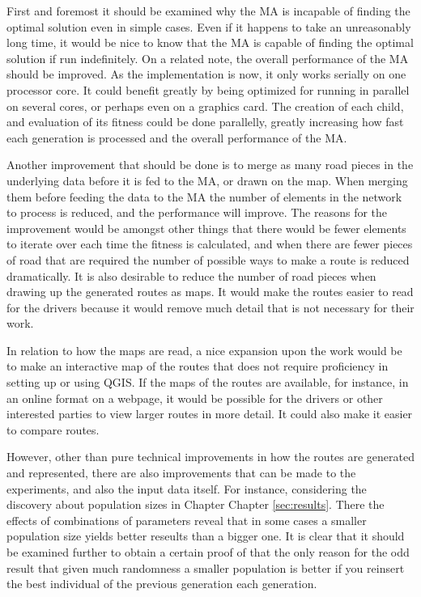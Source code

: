 First and foremost it should be examined why the MA is incapable of finding the optimal solution even in simple cases. Even if it happens to take an unreasonably long time, it would be nice to know that the MA is capable of finding the optimal solution if run indefinitely. On a related note, the overall performance of the MA should be improved. As the implementation is now, it only works serially on one processor core. It could benefit greatly by being optimized for running in parallel on several cores, or perhaps even on a graphics card. The creation of each child, and evaluation of its fitness could be done parallelly, greatly increasing how fast each generation is processed and the overall performance of the MA.

Another improvement that should be done is to merge as many road pieces in the underlying data before it is fed to the MA, or drawn on the map. When merging them before feeding the data to the MA the number of elements in the network to process is reduced, and the performance will improve. The reasons for the improvement would be amongst other things that there would be fewer elements to iterate over each time the fitness is calculated, and when there are fewer pieces of road that are required the number of possible ways to make a route is reduced dramatically. It is also desirable to reduce the number of road pieces when drawing up the generated routes as maps. It would make the routes easier to read for the drivers because it would remove much detail that is not necessary for their work.

In relation to how the maps are read, a nice expansion upon the work would be to make an interactive map of the routes that does not require proficiency in setting up or using QGIS. If the maps of the routes are available, for instance, in an online format on a webpage, it would be possible for the drivers or other interested parties to view larger routes in more detail. It could also make it easier to compare routes.

However, other than pure technical improvements in how the routes are generated and represented, there are also improvements that can be made to the experiments, and also the input data itself. 
For instance, considering the discovery about population sizes in Chapter Chapter \ref{sec:results}. There the effects of combinations of parameters reveal that in some cases a smaller population size yields better reseults than a bigger one. It is clear that it should be examined further to obtain a certain proof of that the only reason for the odd result that given much randomness a smaller population is better if you reinsert the best individual of the previous generation each generation.

